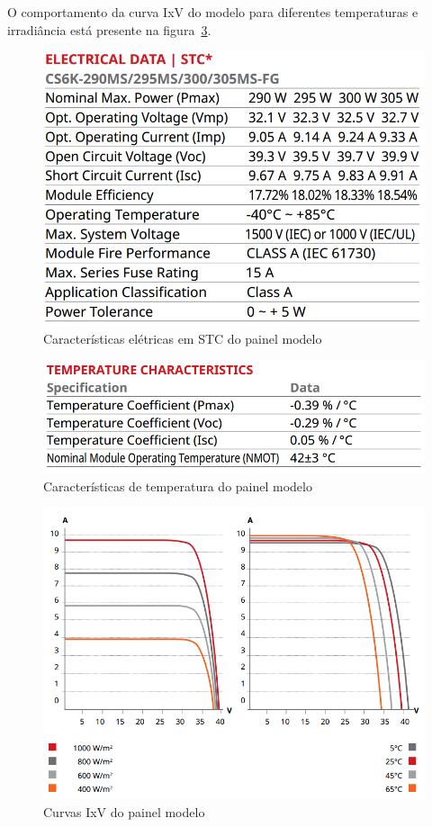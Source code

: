 \documentclass[
	12pt,				%
	openright,			%
	onseside,
	a4paper,			%
	english,			%
	french,				%
	spanish,			%
	brazil,				%
	]{abntex2}
\begin{document}
O comportamento da curva IxV do modelo para diferentes temperaturas e irradiância está presente na figura~\ref{fig:IV_pv_cs}. 
\begin{figure}[]%
	\begin{center}%
		\includegraphics[width=0.55 \linewidth]{elet_canadian_300}
		\caption{Características elétricas em STC do painel modelo \cite{Canadian_Datasheet}}
		\label{fig:pv_elet}
	\end{center}
\end{figure}

\begin{figure}[]%
	\begin{center}%
		\includegraphics[width=0.55 \linewidth]{temp_canad_300}
		\caption{Características de temperatura do painel modelo \cite{Canadian_Datasheet}}
		\label{fig:pv_temp}
	\end{center}
\end{figure}

\begin{figure}[]%
	\begin{center}%
		\includegraphics[width=0.55 \linewidth]{AV_canad_300}
		\caption{Curvas IxV do painel modelo \cite{Canadian_Datasheet}}
		\label{fig:IV_pv_cs}
	\end{center}
\end{figure}
\end{document}
